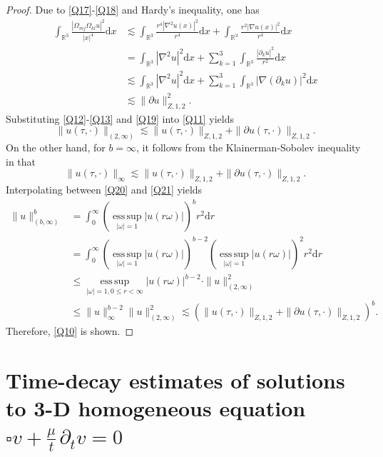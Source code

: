 \documentclass[11pt,twoside]{article}
\newcommand{\R}{\mathbb R}
\newcommand{\p}{\partial}
\newcommand{\f}{\frac}
\theoremstyle{plain}
\theoremstyle{definition}
\theoremstyle{remark}
\numberwithin{equation}{section}
\begin{document}
\begin{proof}
Due to \eqref{Q17}-\eqref{Q18} and Hardy's inequality, one has
\begin{equation}\label{Q19}
\begin{aligned}
\int_{\R^3}\f{|\Omega_{mj}\Omega_{kl}u|^2}{|x|^4}\mathrm{d} x
&\lesssim  \int_{\R^3} \f{r^4|\nabla^2u(x)|^2}{r^4} \mathrm{d} x+\int_{\R^3} \f{r^2|\nabla u(x)|^2}{r^4} \mathrm{d} x\\
&=  \int_{\R^3} |\nabla^2u|^2 \mathrm{d} x+\sum_{k=1}^3\int_{\R^3} \f{|\p_k u|^2}{r^2} \mathrm{d} x\\
&\lesssim  \int_{\R^3} |\nabla^2u|^2 \mathrm{d} x+\sum_{k=1}^3\int_{\R^3} |\nabla(\p_ku)|^2\mathrm{d} x\\
&\lesssim \|\p u\|_{Z, 1, 2}^2.
\end{aligned}
\end{equation}
Substituting \eqref{Q12}-\eqref{Q13} and \eqref{Q19} into \eqref{Q11}  yields
\begin{equation}\label{Q20}
\|u(\tau, \cdot)\|_{(2, \infty)}\lesssim\|u(\tau, \cdot)\|_{Z, 1, 2}+\|\p u(\tau, \cdot)\|_{Z, 1, 2}.
\end{equation}
On the other hand, for $b=\infty$, it follows from the Klainerman-Sobolev inequality in \cite{KS} that
\begin{equation}\label{Q21}
\|u(\tau, \cdot)\|_{\infty} \lesssim \|u(\tau, \cdot)\|_{Z, 1,2}+\|\p u(\tau, \cdot)\|_{Z, 1,2}.
\end{equation}
Interpolating between \eqref{Q20} and \eqref{Q21} yields
\begin{equation}\label{Q22}
\begin{aligned}
\|u\|^{b}_{(b, \infty)}&=\int_0^\infty  (\operatorname*{ess\,sup}_{|\omega|=1}|u(r\omega)|)^{b}r^2\mathrm{d}r\\
&=\int_0^\infty  (\operatorname*{ess\,sup}_{|\omega|=1}|u(r\omega)|)^{b-2}(\operatorname*{ess\,sup}_{|\omega|=1}|u(r\omega)|)^{2}r^2\mathrm{d}r\\
&\leq \operatorname*{ess\,sup}_{|\omega|=1, 0\leq r<\infty}|u(r\omega)|^{b-2}\cdot\|u\|^2_{(2, \infty)}\\
&\leq \|u\|_{\infty}^{b-2}\|u\|^2_{(2, \infty)}\lesssim(\|u(\tau, \cdot)\|_{Z, 1, 2}+\|\p u(\tau, \cdot)\|_{Z, 1, 2})^{b}.
\end{aligned}
\end{equation}
Therefore, \eqref{Q10} is shown.

\end{proof}




\section{Time-decay estimates of solutions to 3-D homogeneous equation $\square v+\f{\mu}{t}\,\p_tv=0$}\label{sec3}
\end{document}
